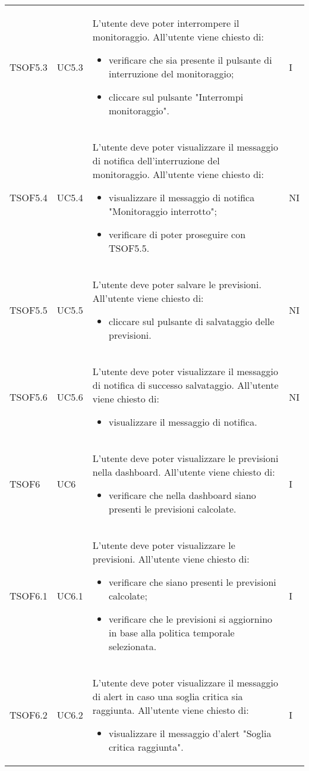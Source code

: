\begin{longtable}{C{2.5cm} C{2.5cm} L{8cm} C{2cm}}
TSOF5.3 &
UC5.3 &
L'utente deve poter interrompere il monitoraggio. All'utente viene chiesto di:
\begin{itemize}
	\item verificare che sia presente il pulsante di interruzione del monitoraggio;
	\item cliccare sul pulsante "Interrompi monitoraggio".
\end{itemize}&
I \\

TSOF5.4 &
UC5.4 &
L'utente deve poter visualizzare il messaggio di notifica dell'interruzione del monitoraggio. All'utente viene chiesto di:
\begin{itemize}
	\item visualizzare il messaggio di notifica "Monitoraggio interrotto";
	\item verificare di poter proseguire con TSOF5.5.
\end{itemize}&
NI \\

TSOF5.5 &
UC5.5 &
L'utente deve poter salvare le previsioni. All'utente viene chiesto di:
\begin{itemize}
	\item cliccare sul pulsante di salvataggio delle previsioni.
\end{itemize}&
NI \\

TSOF5.6 &
UC5.6 &
L'utente deve poter visualizzare il messaggio di notifica di successo salvataggio. All'utente viene chiesto di:
\begin{itemize}
	\item visualizzare il messaggio di notifica.
\end{itemize}&
NI \\

TSOF6 &
UC6 &
L'utente deve poter visualizzare le previsioni nella dashboard. All'utente viene chiesto di:
\begin{itemize}
	\item verificare che nella dashboard siano presenti le previsioni calcolate.
\end{itemize}&
I \\

TSOF6.1 &
UC6.1 &
L'utente deve poter visualizzare le previsioni. All'utente viene chiesto di:
\begin{itemize}
	\item verificare che siano presenti le previsioni calcolate;
	\item verificare che le previsioni si aggiornino in base alla politica temporale selezionata.
\end{itemize}&
I \\

TSOF6.2 &
UC6.2 &
L'utente deve poter visualizzare il messaggio di alert in caso una soglia critica sia raggiunta. All'utente viene chiesto di:
\begin{itemize}
	\item visualizzare il messaggio d'alert "Soglia critica raggiunta".
\end{itemize}&
I \\

\end{longtable}
\pagebreak
